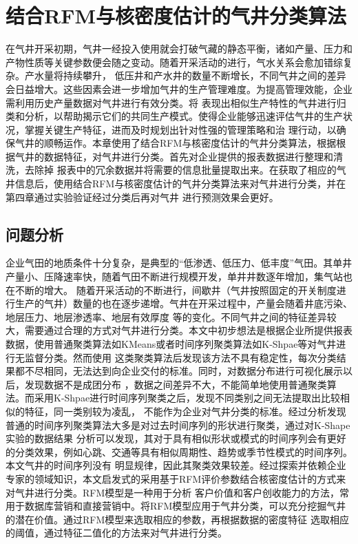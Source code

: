 \chapter{结合RFM与核密度估计的气井分类算法}
在气井开采初期，气井一经投入使用就会打破气藏的静态平衡，诸如产量、压力和产物性质等关键参数便会随之变动。随着开采活动的进行，气水关系会愈加错综复杂。产水量将持续攀升，
低压井和产水井的数量不断增长，不同气井之间的差异会日益增大。这些因素会进一步增加气井的生产管理难度。为提高管理效能，企业需利用历史产量数据对气井进行有效分类。将
表现出相似生产特性的气井进行归类和分析，以帮助揭示它们的共同生产模式。使得企业能够迅速评估气井的生产状况，掌握关键生产特征，进而及时规划出针对性强的管理策略和治
理行动，以确保气井的顺畅运作。本章使用了结合RFM与核密度估计的气井分类算法，根据根据气井的数据特征，对气井进行分类。首先对企业提供的报表数据进行整理和清洗，去除掉
报表中的冗余数据并将需要的信息批量提取出来。在获取了相应的气井信息后，使用结合RFM与核密度估计的气井分类算法来对气井进行分类，并在第四章通过实验验证经过分类后再对气井
进行预测效果会更好。
\section{问题分析}
企业气田的地质条件十分复杂，是典型的“低渗透、低压力、低丰度”气田。其单井产量小、压降速率快，随着气田不断进行规模开发，单井井数逐年增加，集气站也在不断的增大。
随着开采活动的不断进行，间歇井（气井按照固定的开关制度进行生产的气井）数量的也在逐步递增。气井在开采过程中，产量会随着井底污染、地层压力、地层渗透率、地层有效厚度
等的变化。不同气井之间的特征差异较大，需要通过合理的方式对气井进行分类。本文中初步想法是根据企业所提供报表数据，使用普通聚类算法如KMeans或者时间序列聚类算法如K-Shpae等对气井进行无监督分类。然而使用
这类聚类算法后发现该方法不具有稳定性，每次分类结果都不尽相同，无法达到向企业交付的标准。同时，对数据分布进行可视化展示以后，发现数据不是成团分布
，数据之间差异不大，不能简单地使用普通聚类算法。而采用K-Shpae进行时间序列聚类之后，发现不同类别之间无法提取出比较相似的特征，同一类别较为凌乱，
不能作为企业对气井分类的标准。经过分析发现普通的时间序列聚类算法大多是对过去时间序列的形状进行聚类，通过对K-Shape实验的数据结果\cite{Kshapeexperiment}
分析可以发现，其对于具有相似形状或模式的时间序列会有更好的分类效果，例如心跳、交通等具有相似周期性、趋势或季节性模式的时间序列。本文气井的时间序列没有
明显规律，因此其聚类效果较差。经过探索并依赖企业专家的领域知识，本文启发式的采用基于RFM\cite{birant2011data}评价参数结合核密度估计的方式来对气井进行分类。RFM模型是一种用于分析
客户价值和客户创收能力的方法，常用于数据库营销和直接营销中。将RFM模型应用于气井分类，可以充分挖掘气井的潜在价值。通过RFM模型来选取相应的参数，再根据数据的密度特征
选取相应的阈值，通过特征二值化的方法来对气井进行分类。
